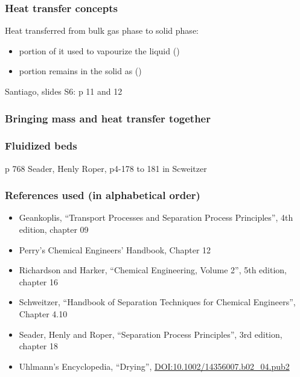 \begin{frame}\frametitle{Heat transfer concepts}
	Heat transferred from bulk gas phase to solid phase: 
	\begin{itemize}
		\item	portion of it used to vapourize the liquid ({\color{purple}{latent heat}})
		\item	portion remains in the solid as ({\color{purple}{sensible heat}})
	\end{itemize}
	
	Santiago, slides S6: p 11 and 12 
\end{frame}

\begin{frame}\frametitle{Bringing mass and heat transfer together}
	
\end{frame}

\begin{frame}\frametitle{Fluidized beds}
	p 768 Seader, Henly Roper,
	p4-178 to 181 in Scweitzer
\end{frame}

\begin{frame}\frametitle{References used (in alphabetical order)}
	\begin{itemize}
		\item	Geankoplis, ``Transport Processes and Separation Process Principles'', 4th edition, chapter 09
		\item	Perry's Chemical Engineers' Handbook, Chapter 12
		\item	Richardson and Harker, ``Chemical Engineering, Volume 2'', 5th edition, chapter 16	
		\item	Schweitzer, ``Handbook of Separation Techniques for Chemical Engineers'', Chapter 4.10
		\item	Seader, Henly and Roper, ``Separation Process Principles'', 3rd edition, chapter 18
		\item	Uhlmann's Encyclopedia, ``Drying'', {\tiny \href{http://dx.doi.org/10.1002/14356007.b02\_04.pub2}{DOI:10.1002/14356007.b02\_04.pub2}}
	\end{itemize}
\end{frame}